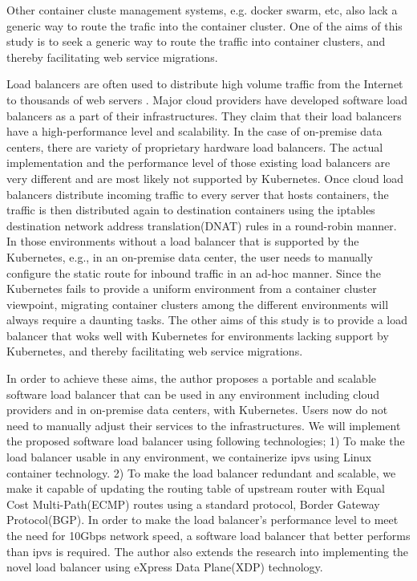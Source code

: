 Other container cluste management systems, e.g. docker swarm, etc, also lack a generic way to route the trafic into the container cluster.
One of the aims of this study is to seek a generic way to route the traffic into container clusters, and thereby facilitating web service migrations.

Load balancers are often used to distribute high volume traffic from the Internet to thousands of web servers .
Major cloud providers have developed software load balancers\cite{eisenbud2016maglev,patel2013ananta} as a part of their infrastructures.
They claim that their load balancers have a high-performance level and scalability.
In the case of on-premise data centers, there are variety of proprietary hardware load balancers.
The actual implementation and the performance level of those existing load balancers are very different and are most likely not supported by Kubernetes.
%
Once cloud load balancers distribute incoming traffic to every server that hosts containers,
the traffic is then distributed again to destination containers using the iptables destination network address translation(DNAT)\cite{MartinA.Brown2017,Marmol2015} rules in a round-robin manner.
In those environments without a load balancer that is supported by the Kubernetes, e.g., in an on-premise data center, the user needs to manually configure the static route for inbound traffic in an ad-hoc manner.
Since the Kubernetes fails to provide a uniform environment from a container cluster viewpoint, migrating container clusters among the different environments will always require a daunting tasks.
The other aims of this study is to provide a load balancer that woks well with Kubernetes for environments lacking support by Kubernetes, and thereby facilitating web service migrations.

In order to achieve these aims, the author proposes a portable and scalable software load balancer that can be used in any environment including cloud providers and in on-premise data centers, with Kubernetes.
Users now do not need to manually adjust their services to the infrastructures.
We will implement the proposed software load balancer using following technologies;
1) To make the load balancer usable in any environment, we containerize ipvs\cite{Zhang2000} using Linux container technology\cite{menage2007adding}.
2) To make the load balancer redundant and scalable, we make it capable of updating the routing table of upstream router with Equal Cost Multi-Path(ECMP) routes\cite{al2008scalable} using a standard protocol, Border Gateway Protocol(BGP).
In order to make the load balancer's performance level to meet the need for 10Gbps network speed, a software load balancer that better performs than ipvs is required.
The author also extends the research into implementing the novel load balancer using eXpress Data Plane(XDP) technology\cite{bertin2017xdp}.

